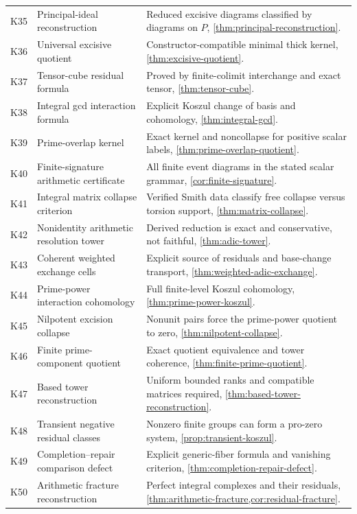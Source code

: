 \documentclass[11pt]{article}
\theoremstyle{definition}
\theoremstyle{remark}
\begin{document}
\begin{longtable}{>{\raggedright\arraybackslash}p{} >{\raggedright\arraybackslash}p{} >{\raggedright\arraybackslash}p{}}
K35 & Principal-ideal reconstruction & Reduced excisive diagrams classified by diagrams on $P$, \cref{thm:principal-reconstruction}.\\
K36 & Universal excisive quotient & Constructor-compatible minimal thick kernel, \cref{thm:excisive-quotient}.\\
K37 & Tensor-cube residual formula & Proved by finite-colimit interchange and exact tensor, \cref{thm:tensor-cube}.\\
K38 & Integral gcd interaction formula & Explicit Koszul change of basis and cohomology, \cref{thm:integral-gcd}.\\
K39 & Prime-overlap kernel & Exact kernel and noncollapse for positive scalar labels, \cref{thm:prime-overlap-quotient}.\\
K40 & Finite-signature arithmetic certificate & All finite event diagrams in the stated scalar grammar, \cref{cor:finite-signature}.\\
K41 & Integral matrix collapse criterion & Verified Smith data classify free collapse versus torsion support, \cref{thm:matrix-collapse}.\\
K42 & Nonidentity arithmetic resolution tower & Derived reduction is exact and conservative, not faithful, \cref{thm:adic-tower}.\\
K43 & Coherent weighted exchange cells & Explicit source of residuals and base-change transport, \cref{thm:weighted-adic-exchange}.\\
K44 & Prime-power interaction cohomology & Full finite-level Koszul cohomology, \cref{thm:prime-power-koszul}.\\
K45 & Nilpotent excision collapse & Nonunit pairs force the prime-power quotient to zero, \cref{thm:nilpotent-collapse}.\\
K46 & Finite prime-component quotient & Exact quotient equivalence and tower coherence, \cref{thm:finite-prime-quotient}.\\
K47 & Based tower reconstruction & Uniform bounded ranks and compatible matrices required, \cref{thm:based-tower-reconstruction}.\\
K48 & Transient negative residual classes & Nonzero finite groups can form a pro-zero system, \cref{prop:transient-koszul}.\\
K49 & Completion--repair comparison defect & Explicit generic-fiber formula and vanishing criterion, \cref{thm:completion-repair-defect}.\\
K50 & Arithmetic fracture reconstruction & Perfect integral complexes and their residuals, \cref{thm:arithmetic-fracture,cor:residual-fracture}.\\

\end{longtable}
\end{document}
